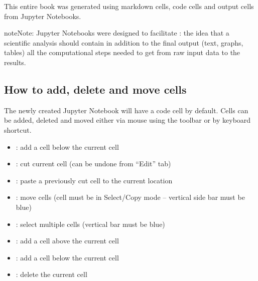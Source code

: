 \documentclass[letterpaper,10pt,english]{jupyterBook}
\begin{document}
\sphinxAtStartPar
{}

\sphinxAtStartPar
This entire book was generated using markdown cells, code cells and output cells from Jupyter Notebooks.

\begin{sphinxadmonition}{note}{Note:}
\sphinxAtStartPar
Jupyter Notebooks were designed to facilitate : the idea that a scientific analysis should contain \sphinxhyphen{} in addition to the final output (text, graphs, tables) \sphinxhyphen{} all the computational steps needed to get from raw input data to the results.
\end{sphinxadmonition}


\subsection{How to add, delete and move cells}
\label{\detokenize{content/04_PythonEssentials/Intro_Jupyter_notebook:how-to-add-delete-and-move-cells}}
\sphinxAtStartPar
The newly created Jupyter Notebook will have a code cell by default.  Cells can be added, deleted and moved either via mouse using the toolbar or by keyboard shortcut.

\sphinxAtStartPar
{}
\begin{itemize}
\item {} 
\sphinxAtStartPar
{}: add a cell below the current cell

\item {} 
\sphinxAtStartPar
{}: cut  current cell (can be undone from “Edit” tab)

\item {} 
\sphinxAtStartPar
{}: paste a previously cut cell to the current location

\item {} 
\sphinxAtStartPar
{}: move cells (cell must be in Select/Copy mode – vertical side bar must be blue)

\item {} 
\sphinxAtStartPar
{}: select multiple cells (vertical bar must be blue)

\end{itemize}

\sphinxAtStartPar
{}
\begin{itemize}
\item {} 
\sphinxAtStartPar
{}: add a cell above the current cell

\item {} 
\sphinxAtStartPar
{}: add a cell below the current cell

\item {} 
\sphinxAtStartPar
{}: delete the current cell

\end{itemize}
\end{document}

